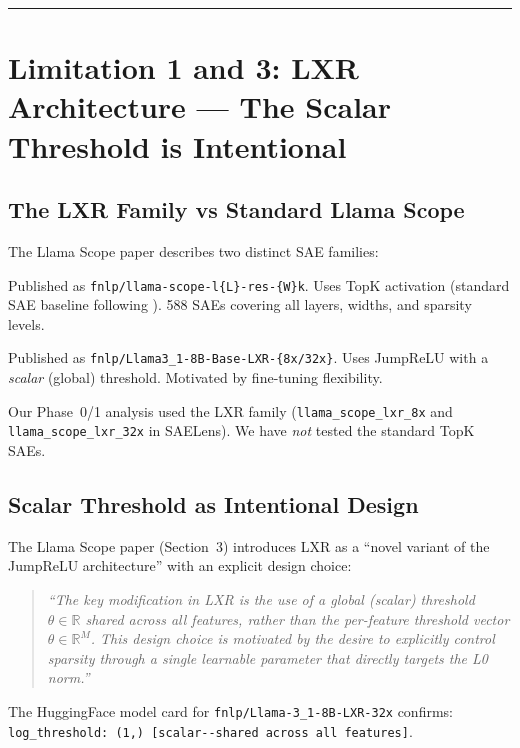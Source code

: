 \documentclass[11pt,a4paper]{article}
\begin{document}
\vspace{0.5em}\hrule\vspace{0.5em}
\tableofcontents\newpage

\section{Limitation 1 and 3: LXR Architecture --- The Scalar Threshold is Intentional}
\label{sec:architecture}

\subsection{The LXR Family vs Standard Llama Scope}

The Llama Scope paper \citep{he2024} describes two distinct SAE families:

\begin{description}[leftmargin=1em]
  \item[Standard Llama Scope (TopK)] Published as \texttt{fnlp/llama-scope-l\{L\}-res-\{W\}k}. Uses TopK activation (standard SAE baseline following \citealt{gao2024}). 588 SAEs covering all layers, widths, and sparsity levels.
  \item[LXR family (scalar-threshold JumpReLU)] Published as \texttt{fnlp/Llama3\_1-8B-Base-LXR-\{8x/32x\}}. Uses JumpReLU with a \emph{scalar} (global) threshold. Motivated by fine-tuning flexibility.
\end{description}

Our Phase~0/1 analysis used the LXR family (\texttt{llama\_scope\_lxr\_8x} and \texttt{llama\_scope\_lxr\_32x} in SAELens). We have \emph{not} tested the standard TopK SAEs.

\subsection{Scalar Threshold as Intentional Design}

The Llama Scope paper (Section~3) introduces LXR as a ``novel variant of the JumpReLU architecture'' with an explicit design choice:
\begin{quote}
\emph{``The key modification in LXR is the use of a global (scalar) threshold $\theta \in \mathbb{R}$ shared across all features, rather than the per-feature threshold vector $\theta \in \mathbb{R}^M$. This design choice is motivated by the desire to explicitly control sparsity through a single learnable parameter that directly targets the L0 norm.''}
\end{quote}
The HuggingFace model card for \texttt{fnlp/Llama-3\_1-8B-LXR-32x} confirms: \texttt{log\_threshold: (1,) [scalar-{}-shared across all features]}.
\end{document}
